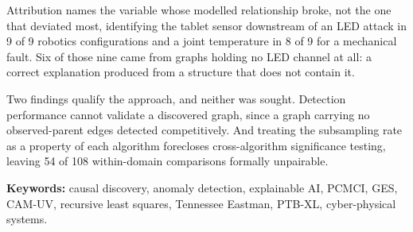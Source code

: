 Attribution names the variable whose modelled relationship broke, not the one that deviated most, identifying the tablet sensor downstream of an LED attack in 9 of 9 robotics configurations and a joint temperature in 8 of 9 for a mechanical fault. Six of those nine came from graphs holding no LED channel at all: a correct explanation produced from a structure that does not contain it.

Two findings qualify the approach, and neither was sought. Detection performance cannot validate a discovered graph, since a graph carrying no observed-parent edges detected competitively. And treating the subsampling rate as a property of each algorithm forecloses cross-algorithm significance testing, leaving 54 of 108 within-domain comparisons formally unpairable.

\vspace{1em}
\noindent\textbf{Keywords:} causal discovery, anomaly detection, explainable AI, PCMCI, GES, CAM-UV, recursive least squares, Tennessee Eastman, PTB-XL, cyber-physical systems.
